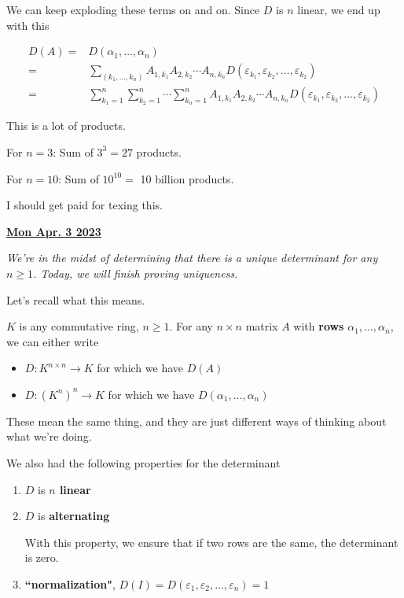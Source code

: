 \documentclass[12pt]{article}
\renewcommand{\date}[1]{\underline{\bf #1}}
\def\eps{\varepsilon}
\begin{document}
{    We can keep exploding these terms on and on. Since $D$ is $n$ linear, we end
    up with this

    \begin{align*}
      D(A) =&D(\alpha_1, \dots, \alpha_n) \\
      =& \sum_{(k_1, \dots, k_n)} A_{1, k_1} A_{2, k_2} \cdots A_{n, k_n} D(\eps_{k_1}, \eps_{k_2}, \dots, \eps_{k_2}) \\
      =& \sum_{k_1 = 1}^n \sum_{k_2 = 1}^n \cdots \sum_{k_n = 1}^n A_{1, k_1} A_{2, k_2} \cdots A_{n, k_n} D(\eps_{k_1}, \eps_{k_2}, \dots, \eps_{k_2})
    \end{align*}

    This is a lot of products.

    For $n = 3$: Sum of $3^3 = 27$ products.

    For $n = 10$: Sum of $10^{10} =$ 10 billion products.
  }

  I should get paid for texing this.



  \date{Mon Apr. 3 2023}

  {\it We're in the midst of determining that there is a unique determinant for
  any $n \ge 1$. Today, we will finish proving uniqueness.}

  Let's recall what this means.

  $K$ is any commutative ring, $n \ge 1$. For any $n \times n$ matrix $A$ with
  {\bf rows} $\alpha_1, \dots, \alpha_n$, we can either write 

  \begin{itemize}
    \item $D: K^{n \times n} \to K$ for which we have $D(A)$
    \item $D: (K^n)^n \to K$ for which we have $D(\alpha_1, \dots, \alpha_n)$
  \end{itemize}

  These mean the same thing, and they are just different ways of thinking about
  what we're doing.

  We also had the following properties for the determinant

  \begin{enumerate}
    \item $D$ is {\bf $n$ linear}
    \item $D$ is {\bf alternating}

      With this property, we ensure that if two rows are the same, the
      determinant is zero.

    \item {\bf ``normalization"}, $D(I) = D(\eps_1, \eps_2, \dots, \eps_n) = 1$ 
  \end{enumerate}
\end{document}
